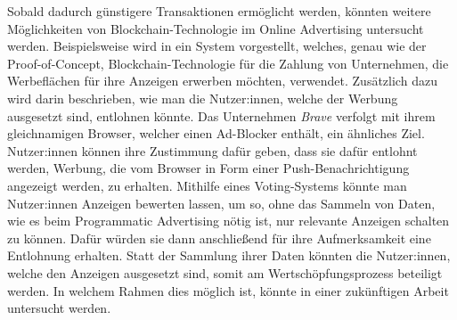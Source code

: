 Sobald dadurch günstigere Transaktionen ermöglicht werden, könnten weitere Möglichkeiten von Blockchain-Technologie im Online Advertising untersucht werden. Beispielsweise wird in \cite{ding_2021} ein System vorgestellt, welches, genau wie der Proof-of-Concept, Blockchain-Technologie für die Zahlung von Unternehmen, die Werbeflächen für ihre Anzeigen erwerben möchten, verwendet. Zusätzlich dazu wird darin beschrieben, wie man die Nutzer:innen, welche der Werbung ausgesetzt sind, entlohnen könnte. Das Unternehmen \emph{Brave} verfolgt mit ihrem gleichnamigen Browser, welcher einen Ad-Blocker enthält, ein ähnliches Ziel. Nutzer:innen können ihre Zustimmung dafür geben, dass sie dafür entlohnt werden, Werbung, die vom Browser in Form einer Push-Benachrichtigung angezeigt werden, zu erhalten. Mithilfe eines Voting-Systems könnte man Nutzer:innen Anzeigen bewerten lassen, um so, ohne das Sammeln von Daten, wie es beim Programmatic Advertising nötig ist, nur relevante Anzeigen schalten zu können. Dafür würden sie dann anschließend für ihre Aufmerksamkeit eine Entlohnung erhalten. Statt der Sammlung ihrer Daten könnten die Nutzer:innen, welche den Anzeigen ausgesetzt sind, somit am Wertschöpfungsprozess beteiligt werden. In welchem Rahmen dies möglich ist, könnte in einer zukünftigen Arbeit untersucht werden.


